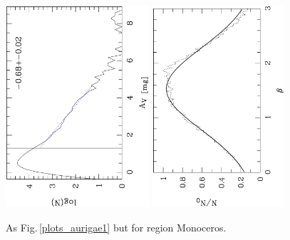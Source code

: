 \documentclass[useAMS,usenatbib]{mn2e}
\begin{document}
\begin{appendix}
\begin{figure}
\includegraphics[height=7.5cm,angle=-90]{av_dist_monocerus.ps}
\hfill
\includegraphics[height=7.5cm,angle=-90]{histo_monocerus.ps}
\caption{\label{plots_monocerus} As Fig.\,\ref{plots_aurigae1} but for region
Monoceros.}  
\end{figure}


\end{appendix}
\end{document}
